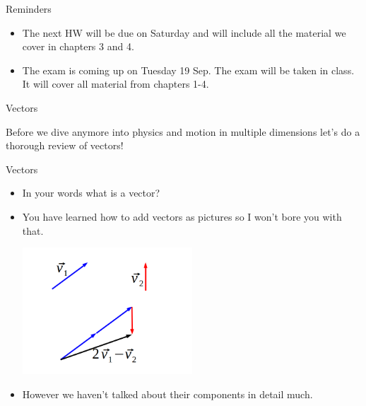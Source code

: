 \documentclass{beamer}
\begin{document}
\begin{frame}{Reminders}
\begin{itemize}
   \item The next HW will be due on Saturday and will include all the material we cover in chapters 3 and 4.
   \item The exam is coming up on Tuesday 19 Sep. The exam will be taken in class. It will cover all material from chapters 1-4.
\end{itemize}
\end{frame}

\begin{frame}{Vectors}
\begin{center}
   Before we dive anymore into physics and motion in multiple dimensions let's do a thorough review of vectors!
\end{center}
\end{frame}

\begin{frame}{Vectors}
\begin{itemize}
   \item<1-> In your words what is a vector?
   \item<2-> You have learned how to add vectors as pictures so I won't bore you with that.
   \begin{center}
      \includegraphics[width=0.5\textwidth]{../figures/1_4-5QuizAns.png}
   \end{center}
   \item<3-> However we haven't talked about their components in detail much.
\end{itemize}
\end{frame}
\end{document}
